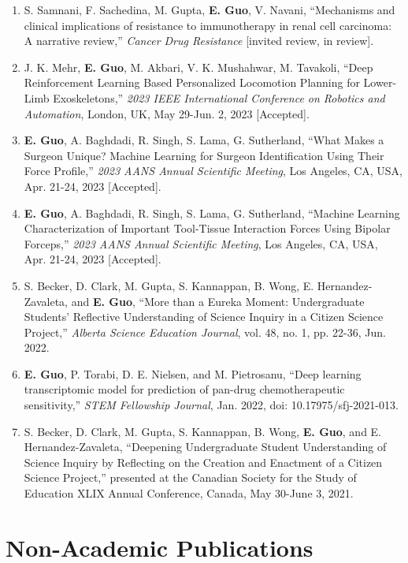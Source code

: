 \documentclass{article}
\begin{document}
\begin{enumerate}[itemsep=1em]
    \item S. Samnani, F. Sachedina, M. Gupta, \textbf{E. Guo}, V. Navani, ``Mechanisms and clinical implications of resistance to immunotherapy in renal cell carcinoma: A narrative review,'' \textit{Cancer Drug Resistance} [invited review, in review].
    \item J. K. Mehr, \textbf{E. Guo}, M. Akbari, V. K. Mushahwar, M. Tavakoli, ``Deep Reinforcement Learning Based Personalized Locomotion Planning for Lower-Limb Exoskeletons,'' \textit{2023 IEEE International Conference on Robotics and Automation}, London, UK, May 29-Jun. 2, 2023 [Accepted].
    \item \textbf{E. Guo}, A. Baghdadi, R. Singh, S. Lama, G. Sutherland, ``What Makes a Surgeon Unique? Machine Learning for Surgeon Identification Using Their Force Profile,'' \textit{2023 AANS Annual Scientific Meeting}, Los Angeles, CA, USA, Apr. 21-24, 2023 [Accepted].
    \item \textbf{E. Guo}, A. Baghdadi, R. Singh, S. Lama, G. Sutherland, ``Machine Learning Characterization of Important Tool-Tissue Interaction Forces Using Bipolar Forceps,'' \textit{2023 AANS Annual Scientific Meeting}, Los Angeles, CA, USA, Apr. 21-24, 2023 [Accepted].
    \item S. Becker, D. Clark, M. Gupta, S. Kannappan, B. Wong, E. Hernandez-Zavaleta, and \textbf{E. Guo}, ``More than a Eureka Moment: Undergraduate Students' Reflective Understanding of Science Inquiry in a Citizen Science Project,'' \textit{Alberta Science Education Journal}, vol. 48, no. 1, pp. 22-36, Jun. 2022.
    \item \textbf{E. Guo}, P. Torabi, D. E. Nielsen, and M. Pietrosanu, ``Deep learning transcriptomic model for prediction of pan-drug chemotherapeutic sensitivity,'' \textit{STEM Fellowship Journal}, Jan. 2022, doi: 10.17975/sfj-2021-013.
    \item S. Becker, D. Clark, M. Gupta, S. Kannappan, B. Wong, \textbf{E. Guo}, and E. Hernandez-Zavaleta, ``Deepening Undergraduate Student Understanding of Science Inquiry by Reflecting on the Creation and Enactment of a Citizen Science Project,'' presented at the Canadian Society for the Study of Education XLIX Annual Conference, Canada, May 30-June 3, 2021.
\end{enumerate}

\section*{\textcolor{my_colour}{Non-Academic Publications}}
\vspace{-.25em} \hrulefill \vspace{.25em}
\end{document}
